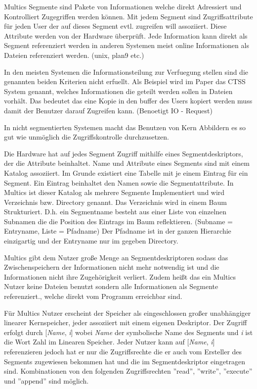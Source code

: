 \documentclass[11pt,technote]{IEEEtran}
\begin{document}
		    Multics Segmente sind Pakete von Informationen welche direkt Adressiert und Kontrolliert Zugegriffen werden k\"onnen.
		    Mit jedem Segment sind Zugriffsattribute f\"ur jeden User der auf dieses Segment evtl. zugreifen will assoziiert.
		    Diese Attribute werden von der Hardware \"uberpr\"uft. Jede Information kann direkt als Segment referenziert werden
		    in anderen Systemen meist online Informationen als Dateien referenziert werden. (unix, plan9 etc.)
		  
		    In den meisten Systemen die Informationsteilung zur Verfuegung stellen sind die genannten beiden Kriterien nicht erfuellt.
		    Als Beispiel wird im Paper \cite{inproc:multics} das CTSS System genannt, welches Informationen die geteilt werden sollen in Dateien vorh\"alt.
		    Das bedeutet das eine Kopie in den buffer des Users kopiert werden muss damit der Benutzer darauf Zugreifen kann. (Benoetigt IO - Request)
		  
		    In nicht segmentierten Systemen macht das Benutzen von Kern Abbildern es so gut wie unm\"oglich die Zugriffskontrolle durchzusetzen.
		  
        Die Hardware hat auf jedes Segment Zugriff mithilfe eines Segmentdeskriptors, der die Attribute beinhaltet.
		    Name und Attribute eines Segments sind mit einem Katalog assoziiert. Im Grunde existiert eine Tabelle mit je einem Eintrag f\"ur ein Segment. 
		    Ein Eintrag beinhaltet den Namen sowie die Segmentattribute. In Multics ist dieser Katalog als mehrere
		    Segmente Implementiert und wird Verzeichnis bzw. Directory genannt. Das Verzeichnis wird in einem Baum Strukturiert.
		    D.h. ein Segmentname besteht aus einer Liste von einzelnen Subnamen die die Position des Eintrags im Baum reflektieren.
		    (Subname = Entryname, Liste = Pfadname)
		    Der Pfadname ist in der ganzen Hierarchie einzigartig und der Entryname nur im gegeben Directory.
		     
		    Multics gibt dem Nutzer gro\ss e Menge an Segmentdeskriptoren sodass das Zwischenspeichern der Informationen nicht mehr notwendig ist und 
		    die Informationen nicht ihre Zugeh\"origkeit verliert. Zudem hei\ss t das ein Multics Nutzer keine Dateien benutzt sondern alle Informationen
		    als Segmente referenziert., welche direkt vom Programm erreichbar sind.
		 
        F\"ur Multics Nutzer erscheint der Speicher als eingeschlossen gro\ss er unabh\"angiger linearer Kernspeicher,
        jeder assoziiert mit einem eigenen Deskriptor. 
        Der Zugriff erfolgt durch [\textit{Name}, \textit{i}] wobei \textit{Name} der symbolische Name des Segments und \textit{i} ist die Wort Zahl
        im Linearen Speicher. Jeder Nutzer kann auf [\textit{Name}, \textit{i}] referenzieren jedoch hat er nur die Zugriffsrechte die er auch vom Ersteller
	      des Segments zugewiesen bekommen hat und die im Segmentdeskriptor eingetragen sind.
	      Kombinationen von den folgenden Zugriffsrechten ''read'', ''write'', ''execute'' und ''append'' sind m\"oglich.
	 
\end{document}
